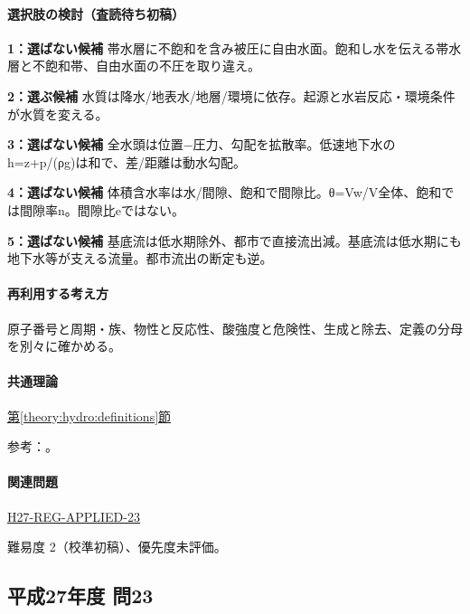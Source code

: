 \paragraph{選択肢の検討（査読待ち初稿）}\mbox{}\par

\noindent\textbf{1：選ばない候補} 帯水層に不飽和を含み被圧に自由水面。飽和し水を伝える帯水層と不飽和帯、自由水面の不圧を取り違え。\par

\noindent\textbf{2：選ぶ候補} 水質は降水/地表水/地層/環境に依存。起源と水岩反応・環境条件が水質を変える。\par

\noindent\textbf{3：選ばない候補} 全水頭は位置−圧力、勾配を拡散率。低速地下水のh=\allowbreak{}z+p/(ρg)は和で、差/距離は動水勾配。\par

\noindent\textbf{4：選ばない候補} 体積含水率は水/間隙、飽和で間隙比。θ=Vw/V全体、飽和では間隙率n。間隙比eではない。\par

\noindent\textbf{5：選ばない候補} 基底流は低水期除外、都市で直接流出減。基底流は低水期にも地下水等が支える流量。都市流出の断定も逆。\par

\paragraph{再利用する考え方} 原子番号と周期・族、物性と反応性、酸強度と危険性、生成と除去、定義の分母を別々に確かめる。

\paragraph{共通理論} \hyperref[theory:hydro:definitions]{第\ref*{theory:hydro:definitions}節}

\par 参考：\cite{inorganic_waterchem,inorganic_hydro_ref}。

\paragraph{関連問題} \hyperref[q:h27-reg-applied-23]{H27-REG-APPLIED-23}

\par 難易度 2（校準初稿）、優先度未評価。

\subsection{平成27年度 問23}
\label{q:h27-reg-applied-23}

